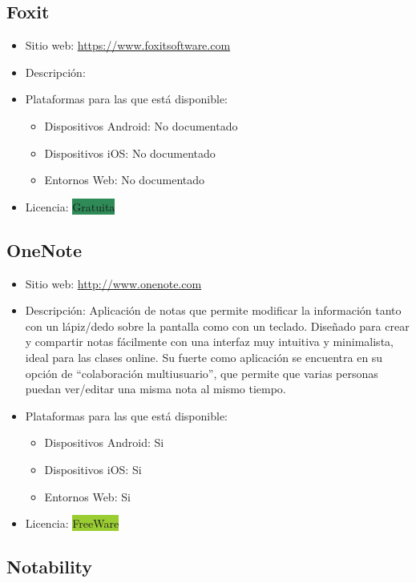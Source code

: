 \documentclass[11pt]{article}
\newcommand{\nodoc}{No documentado}
\newcommand{\gratis}{\colorbox{SeaGreen}{Gratuita}}
\newcommand{\fw}{\colorbox{YellowGreen}{FreeWare}}
\begin{document}
\subsection{Foxit}

\begin{itemize}
\item Sitio web: \url{https://www.foxitsoftware.com}
\item Descripción:
\item Plataformas para las que está disponible:
  \begin{itemize}
  \item Dispositivos Android: \nodoc
  \item Dispositivos iOS: \nodoc
  \item Entornos Web: \nodoc
  \end{itemize}
\item Licencia: \gratis
\end{itemize}

\subsection{OneNote}

\begin{itemize}
\item Sitio web: \url{http://www.onenote.com}
\item Descripción: Aplicación de notas que permite modificar la información tanto con un lápiz/dedo sobre la pantalla como con un teclado. Diseñado para crear y compartir notas fácilmente con una interfaz muy intuitiva y minimalista, ideal para las clases online. Su fuerte como aplicación se encuentra en su opción de ``colaboración multiusuario'', que permite que varias personas puedan ver/editar una misma nota al mismo tiempo.
\item Plataformas para las que está disponible:
  \begin{itemize}
  \item Dispositivos Android: Si
  \item Dispositivos iOS: Si
  \item Entornos Web: Si
  \end{itemize}
\item Licencia: \fw
\end{itemize}

\subsection{Notability}
\end{document}
